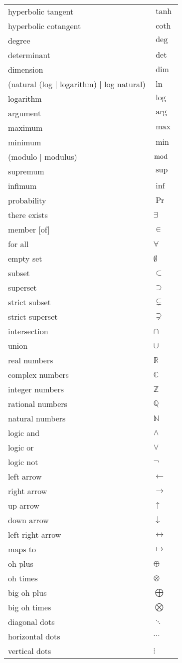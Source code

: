 \documentclass[12pt]{article}
\begin{document}
\begin{longtable}{ l l}
hyperbolic tangent & $\tanh$ \\
hyperbolic cotangent & $\coth$ \\
degree & $\deg$ \\
determinant & $\det$ \\
dimension & $\dim$ \\
(natural (log | logarithm) | log natural) & $\ln$ \\
logarithm & $\log$ \\
argument & $\arg$ \\
maximum & $\max$ \\
minimum & $\min$ \\
(modulo | modulus) & $\bmod$ \\
supremum & $\sup$ \\
infimum & $\inf$ \\
probability & $\Pr$ \\
there exists & $\exists$ \\
member [of] & $\in$ \\
for all & $\forall$ \\
empty set & $\emptyset$ \\
subset & $\subset$ \\
superset & $\supset$ \\
strict subset & $\subsetneq$ \\
strict superset & $\supsetneq$ \\
intersection & $\cap$ \\
union & $\cup$ \\
real numbers & $\mathbb{R}$ \\
complex numbers & $\mathbb{C}$ \\
integer numbers & $\mathbb{Z}$ \\
rational numbers & $\mathbb{Q}$ \\
natural numbers & $\mathbb{N}$ \\
logic and & $\land$ \\
logic or & $\lor$ \\
logic not & $\lnot$ \\
left arrow & $\leftarrow$ \\
right arrow & $\rightarrow$ \\
up arrow & $\uparrow$ \\
down arrow & $\downarrow$ \\
left right arrow & $\leftrightarrow$ \\
maps to & $\mapsto$ \\
oh plus & $\oplus$ \\
oh times & $\otimes$ \\
big oh plus & $\bigoplus$ \\
big oh times & $\bigotimes$ \\
diagonal dots & $\ddots$ \\
horizontal dots & $\cdots$ \\
vertical dots & $\vdots$ \\
\end{longtable}
\end{document}
